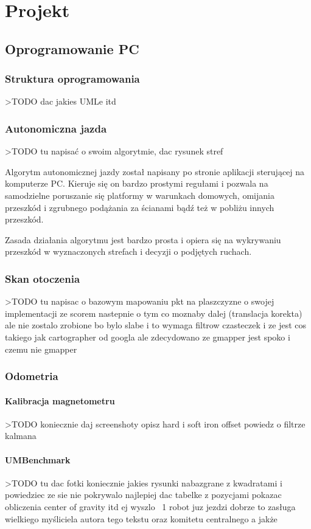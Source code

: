 \chapter{Projekt}
\section{Oprogramowanie PC}
\subsection{Struktura oprogramowania}
>TODO dac jakies UMLe itd

\subsection{Autonomiczna jazda}
>TODO tu napisać o swoim algorytmie, dac rysunek stref

Algorytm autonomicznej jazdy został napisany po stronie aplikacji sterującej na komputerze PC. Kieruje się on bardzo prostymi regułami i pozwala na samodzielne poruszanie się platformy w warunkach domowych, omijania przeszkód i zgrubnego podążania za ścianami bądź też w pobliżu innych przeszkód.

Zasada działania algorytmu jest bardzo prosta i opiera się na wykrywaniu przeszkód w wyznaczonych strefach i decyzji o podjętych ruchach.

\subsection{Skan otoczenia}
>TODO tu napisac o bazowym mapowaniu pkt na plaszczyzne
o swojej implementacji ze scorem
nastepnie o tym co moznaby dalej (translacja korekta)
ale nie zostalo zrobione bo bylo slabe i to wymaga filtrow czasteczek
i ze jest cos takiego jak cartographer od googla
ale zdecydowano ze gmapper jest spoko i czemu nie gmapper

\subsection{Odometria}
\subsubsection{Kalibracja magnetometru}
>TODO koniecznie daj screenshoty
opisz hard i soft iron offset
powiedz o filtrze kalmana

\subsubsection{UMBenchmark\cite{Borenstein1995}}
>TODO tu dac fotki koniecznie
jakies rysunki nabazgrane z kwadratami
i powiedziec ze sie nie pokrywalo najlepiej
dac tabelke z pozycjami
pokazac obliczenia center of gravity itd
ej wyszlo ~1%
robot juz jezdzi dobrze
to zasługa wielkiego myśliciela autora tego tekstu
oraz komitetu centralnego
a jakże

